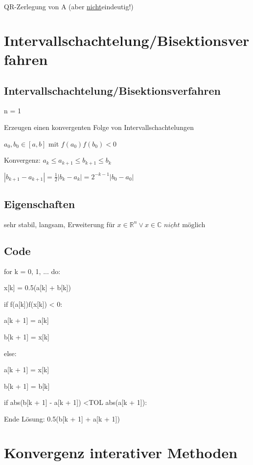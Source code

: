 \documentclass[12pt,a4paper]{article} %
\newcommand*\tab[1][1cm]{\hspace*{#1}}
\begin{document}
	QR-Zerlegung von A (aber \underline{nicht}eindeutig!)
	
	\newpage
	
	\section{Intervallschachtelung/Bisektionsverfahren}
	
	\subsection{Intervallschachtelung/Bisektionsverfahren}
	
	n = 1
	
	Erzeugen einen konvergenten Folge von Intervallschachtelungen
	
	$a_0, b_0 \in [a, b]$ mit $f(a_0)f(b_0) < 0$
	
	Konvergenz: $a_k \le a_{k + 1} \le b_{k + 1} \le b_k$
	
	$|b_{k + 1} - a_{k + 1}| = \frac{1}{2}|b_k - a_k| = 2^{-k - 1}|b_0 - a_0|$
	
	\subsection{Eigenschaften}
	
	sehr stabil, langsam, Erweiterung für $x \in \mathbb{R}^n \vee x \in \mathbb{C}$ $\underline{nicht}$ möglich
	
	\subsection{Code}
	
	for k = 0, 1, ... do:
	
	\tab x[k] = 0.5(a[k] + b[k])
	
	\tab if f(a[k])f(x[k]) < 0:
	
	\tab \tab a[k + 1] = a[k]
	
	\tab \tab b[k + 1] = x[k]
	
	\tab else:
	
	\tab \tab a[k + 1] = x[k]
	
	\tab \tab b[k + 1] = b[k]
	
	\tab if abs(b[k + 1] - a[k + 1]) \textless TOL abs(a[k + 1]):
	
	\tab \tab Ende Lösung: 0.5(b[k + 1] + a[k + 1])
	
	\newpage
	
	\section{Konvergenz interativer Methoden}
	
\end{document}
